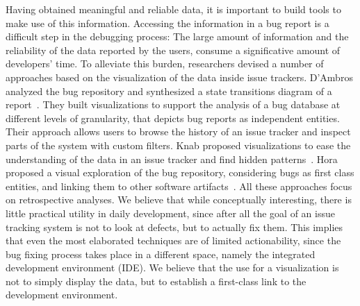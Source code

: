 
Having obtained meaningful and reliable data, it is important to build tools to make use of this information. Accessing the information in a bug report is a difficult step in the debugging process: The large amount of information and the reliability of the data reported by the users, consume a significative amount of developers' time. To alleviate this burden, researchers devised a number of approaches based on the visualization of the data inside issue trackers. D'Ambros \etal analyzed the \bzilla bug repository and synthesized a state transitions diagram of a report~\cite{DAmb2007b}. They built visualizations to support the analysis of a bug database at different levels of granularity, that depicts bug reports as independent entities. Their approach allows users to browse the history of an issue tracker and inspect parts of the system with custom filters. Knab \etal proposed visualizations to ease the understanding of the data in an issue tracker and find hidden patterns~\cite{Knab2009,Knab2010}. Hora \etal proposed a visual exploration of the bug repository, considering bugs as first class entities, and linking them to other software artifacts~\cite{Hora2012}. All these approaches focus on retrospective analyses. We believe that while conceptually interesting, there is little practical utility in daily development, since after all the goal of an issue tracking system is not to look at defects, but to actually fix them. This implies that even the most elaborated techniques are of limited actionability, since the bug fixing process takes place in a different space, namely the integrated development environment (IDE). We believe that the use for a visualization is not to simply display the data, but to establish a first-class link to the development environment. 



